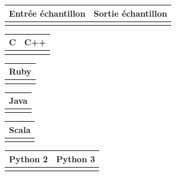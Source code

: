 \begin{tabular}{|p{}|p{}|}
\hline
\textbf{Entrée échantillon} & \textbf{Sortie échantillon} \\
\hline
 &
 \\
\hline
\end{tabular}

\begin{tabular}{|p{}|p{}|}
\hline
\textbf{C} & \textbf{C++} \\
\hline
&
\\
\hline
\end{tabular}

\begin{tabular}{|p{}|}
\hline
\textbf{Ruby}\\
\hline
\\
\hline
\end{tabular}


\begin{tabular}{|p{}|}
\hline
\textbf{Java}\\
\hline
\\
\hline
\end{tabular}

\begin{tabular}{|p{}|}
\hline
\textbf{Scala}\\
\hline
\\
\hline
\end{tabular}

\begin{tabular}{|p{}|p{}|}
\hline
\textbf{Python 2} & \textbf{Python 3} \\
\hline
&
\\
\hline
\end{tabular}


